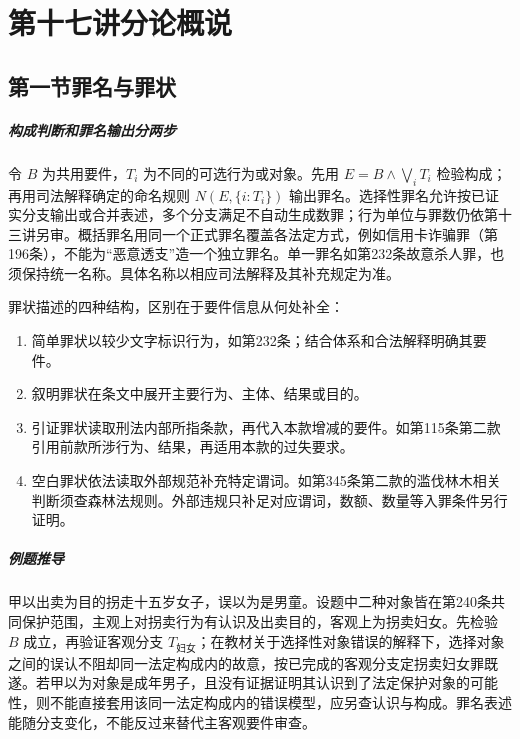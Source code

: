 \chapter{第十七讲\quad 分论概说}
\label{lecture:17}
\par

\section{第一节\quad 罪名与罪状}
\paragraph{构成判断和罪名输出分两步}
令 \(B\) 为共用要件，\(T_i\) 为不同的可选行为或对象。先用 \(E=B\land\bigvee_i T_i\) 检验构成；再用司法解释确定的命名规则 \(N(E,\{i:T_i\})\) 输出罪名。选择性罪名允许按已证实分支输出或合并表述，多个分支满足不自动生成数罪；行为单位与罪数仍依第十三讲另审。概括罪名用同一个正式罪名覆盖各法定方式，例如信用卡诈骗罪（第196条），不能为“恶意透支”造一个独立罪名。单一罪名如第232条故意杀人罪，也须保持统一名称。具体名称以相应司法解释及其补充规定为准。

罪状描述的四种结构，区别在于要件信息从何处补全：
\begin{enumerate}
 \item 简单罪状以较少文字标识行为，如第232条；结合体系和合法解释明确其要件。
 \item 叙明罪状在条文中展开主要行为、主体、结果或目的。
 \item 引证罪状读取刑法内部所指条款，再代入本款增减的要件。如第115条第二款引用前款所涉行为、结果，再适用本款的过失要求。
 \item 空白罪状依法读取外部规范补充特定谓词。如第345条第二款的滥伐林木相关判断须查森林法规则。外部违规只补足对应谓词，数额、数量等入罪条件另行证明。
\end{enumerate}

\paragraph{例题推导}
甲以出卖为目的拐走十五岁女子，误以为是男童。设题中二种对象皆在第240条共同保护范围，主观上对拐卖行为有认识及出卖目的，客观上为拐卖妇女。先检验 \(B\) 成立，再验证客观分支 \(T_{\text{妇女}}\)；在教材关于选择性对象错误的解释下，选择对象之间的误认不阻却同一法定构成内的故意，按已完成的客观分支定拐卖妇女罪既遂。若甲以为对象是成年男子，且没有证据证明其认识到了法定保护对象的可能性，则不能直接套用该同一法定构成内的错误模型，应另查认识与构成。罪名表述能随分支变化，不能反过来替代主客观要件审查。

